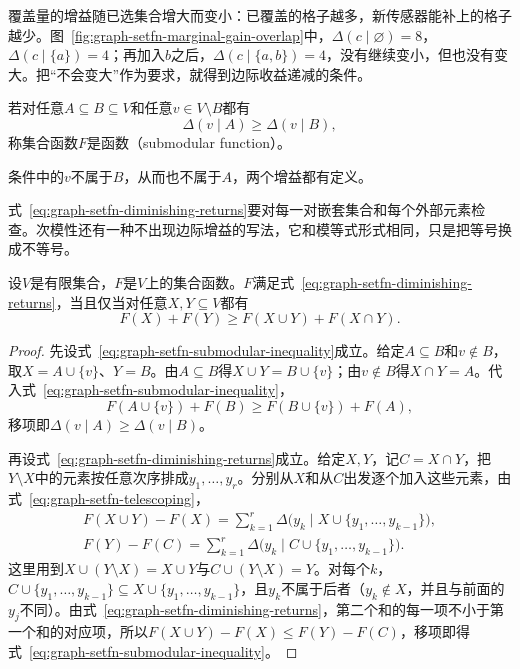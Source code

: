 覆盖量的增益随已选集合增大而变小：已覆盖的格子越多，新传感器能补上的格子越少。图~\ref{fig:graph-setfn-marginal-gain-overlap}中，$\Delta(c\mid\varnothing)=8$，$\Delta(c\mid\{a\})=4$；再加入$b$之后，$\Delta(c\mid\{a,b\})=4$，没有继续变小，但也没有变大。把“不会变大”作为要求，就得到边际收益递减的条件。

\begin{definition}[次模函数]
\label{def:graph-setfn-submodular}
若对任意$A\subseteq B\subseteq V$和任意$v\in V\setminus B$都有
\begin{equation}
  \Delta(v\mid A)\geq\Delta(v\mid B),
  \label{eq:graph-setfn-diminishing-returns}
\end{equation}
称集合函数$F$是函数（submodular function）。
\end{definition}

条件中的$v$不属于$B$，从而也不属于$A$，两个增益都有定义。

式~\eqref{eq:graph-setfn-diminishing-returns}要对每一对嵌套集合和每个外部元素检查。次模性还有一种不出现边际增益的写法，它和模等式形式相同，只是把等号换成不等号。

\begin{theorem}[次模性的两种刻画]
\label{thm:graph-setfn-submodular-equivalence}
设$V$是有限集合，$F$是$V$上的集合函数。$F$满足式~\eqref{eq:graph-setfn-diminishing-returns}，当且仅当对任意$X,Y\subseteq V$都有
\begin{equation}
  F(X)+F(Y)\geq F(X\cup Y)+F(X\cap Y).
  \label{eq:graph-setfn-submodular-inequality}
\end{equation}
\end{theorem}

\begin{proof}
先设式~\eqref{eq:graph-setfn-submodular-inequality}成立。给定$A\subseteq B$和$v\notin B$，取$X=A\cup\{v\}$、$Y=B$。由$A\subseteq B$得$X\cup Y=B\cup\{v\}$；由$v\notin B$得$X\cap Y=A$。代入式~\eqref{eq:graph-setfn-submodular-inequality}，
\[
  F(A\cup\{v\})+F(B)\geq F(B\cup\{v\})+F(A),
\]
移项即$\Delta(v\mid A)\geq\Delta(v\mid B)$。

再设式~\eqref{eq:graph-setfn-diminishing-returns}成立。给定$X,Y$，记$C=X\cap Y$，把$Y\setminus X$中的元素按任意次序排成$y_1,\ldots,y_r$。分别从$X$和从$C$出发逐个加入这些元素，由式~\eqref{eq:graph-setfn-telescoping}，
\[
  \begin{gathered}
  F(X\cup Y)-F(X)=\sum_{k=1}^{r}\Delta\bigl(y_k\mid X\cup\{y_1,\ldots,y_{k-1}\}\bigr),\\
  F(Y)-F(C)=\sum_{k=1}^{r}\Delta\bigl(y_k\mid C\cup\{y_1,\ldots,y_{k-1}\}\bigr).
  \end{gathered}
\]
这里用到$X\cup(Y\setminus X)=X\cup Y$与$C\cup(Y\setminus X)=Y$。对每个$k$，$C\cup\{y_1,\ldots,y_{k-1}\}\subseteq X\cup\{y_1,\ldots,y_{k-1}\}$，且$y_k$不属于后者（$y_k\notin X$，并且与前面的$y_j$不同）。由式~\eqref{eq:graph-setfn-diminishing-returns}，第二个和的每一项不小于第一个和的对应项，所以$F(X\cup Y)-F(X)\leq F(Y)-F(C)$，移项即得式~\eqref{eq:graph-setfn-submodular-inequality}。
\end{proof}

